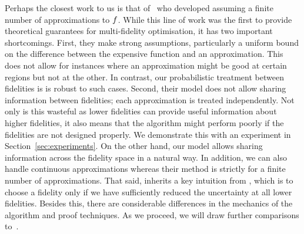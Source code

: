 Perhaps the closest work to us is that of~\citet{kandasamy16mfbo,kandasamy16mfbandit}
who developed \mfgpucbones assuming a finite number of approximations to $f$.
While this line of work was the first to provide theoretical guarantees for
multi-fidelity optimisation, it has two important shortcomings.
First, they make strong assumptions, particularly a uniform bound on the
difference between the expensive function and an approximation.
This does not allow for instances where an approximation might be good at certain regions
but not at the other.
In contrast, our probabilistic treatment between fidelities is is robust
to such cases.
Second, their model does not allow sharing information between fidelities; each
approximation is treated independently.
Not only is this wasteful as lower fidelities can provide useful information about
higher fidelities, it also means that the algorithm might perform poorly if the fidelities
are not designed properly.
We demonstrate this with an experiment in Section~\ref{sec:experiments}.
On the other hand, our model allows sharing information across the fidelity space in a
natural way.
In addition, we can also handle continuous approximations whereas their method is strictly
for a finite number of approximations.
That said, \mfgpucbtwos inherits a key intuition from \mfgpucbone,
which is to choose a fidelity only if we have sufficiently reduced the uncertainty at
all lower fidelities.
Besides this, there are considerable differences in the mechanics
of the algorithm and proof techniques.
As we proceed, we will draw further comparisons to~\citet{kandasamy16mfbo}.

